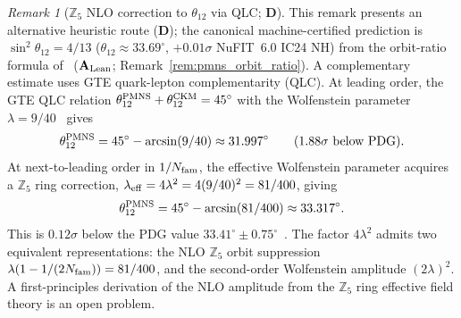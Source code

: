 \documentclass[11pt]{article}
\theoremstyle{remark}
\newtheorem{remark}[theorem]{Remark}
\newcommand{\Nfam}{N_{\rm fam}}
\newcommand{\CatAL}{\ensuremath{\textbf{A}_{\rm Lean}}}
\newcommand{\CatD}{\textbf{D}}
\begin{document}
\begin{remark}[$\mathbb{Z}_5$ NLO correction to $\theta_{12}$ via QLC; $\CatD$]
\label{rem:theta12_nlo}
This remark presents an alternative heuristic route (\CatD); the canonical
machine-certified prediction is $\sin^2\theta_{12} = 4/13$
($\theta_{12} \approx 33.69^\circ$, $+0.01\sigma$ NuFIT~6.0 IC24 NH) from the
orbit-ratio formula of~\cite{SpivackNeutrino} (\CatAL;
Remark~\ref{rem:pmns_orbit_ratio}).
A complementary estimate uses GTE quark-lepton complementarity (QLC).
At leading order, the GTE QLC relation
$\theta_{12}^{\rm PMNS} + \theta_{12}^{\rm CKM} = 45^{\circ}$
with the Wolfenstein parameter $\lambda = 9/40$~\cite{SpivackCKM} gives
\begin{equation}
  \theta_{12}^{\rm PMNS} = 45^{\circ} - \arcsin(9/40) \approx 31.997^{\circ}
  \qquad (1.88\sigma \text{ below PDG}).
  \label{eq:theta12_qlc_lo}
\end{equation}
At next-to-leading order in $1/\Nfam$, the effective Wolfenstein parameter
acquires a $\mathbb{Z}_5$ ring correction, $\lambda_{\rm eff} = 4\lambda^2 =
4(9/40)^2 = 81/400$, giving
\begin{equation}
  \theta_{12}^{\rm PMNS} = 45^{\circ} - \arcsin(81/400) \approx 33.317^{\circ}.
  \label{eq:theta12_qlc_nlo}
\end{equation}
This is $0.12\sigma$ below the PDG value $33.41^{\circ} \pm 0.75^{\circ}$~\cite{PDG2022}.
The factor $4\lambda^2$ admits two equivalent representations:
the NLO $\mathbb{Z}_5$ orbit suppression $\lambda(1 - 1/(2\Nfam)) = 81/400$,
and the second-order Wolfenstein amplitude $(2\lambda)^2$.
A first-principles derivation of the NLO amplitude from the $\mathbb{Z}_5$ ring
effective field theory is an open problem.
\end{remark}
\end{document}
